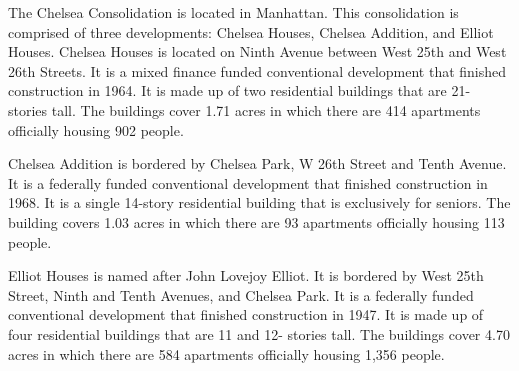 The Chelsea Consolidation is located in Manhattan. This consolidation is comprised of three developments: Chelsea Houses, Chelsea Addition, and Elliot Houses. Chelsea Houses is located on Ninth Avenue between West 25th and West 26th Streets. It is a mixed finance funded conventional development that finished construction in 1964. It is made up of two residential buildings that are 21- stories tall. The buildings cover 1.71 acres in which there are 414 apartments officially housing 902 people. \par \vspace{.7\baselineskip}Chelsea Addition is bordered by Chelsea Park, W 26th Street and Tenth Avenue. It is a federally funded conventional development that finished construction in 1968. It is a single 14-story residential building that is exclusively for seniors. The building covers 1.03 acres in which there are 93 apartments officially housing 113 people. \par \vspace{.7\baselineskip}Elliot Houses is named after John Lovejoy Elliot. It is bordered by West 25th Street, Ninth and Tenth Avenues, and Chelsea Park. It is a federally funded conventional development that finished construction in 1947. It is made up of four residential buildings that are 11 and 12- stories tall. The buildings cover 4.70 acres in which there are 584 apartments officially housing 1,356 people.